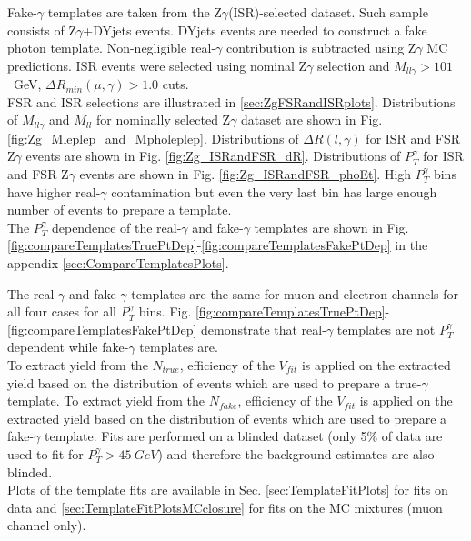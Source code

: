Fake-$\gamma$ templates are taken from the Z$\gamma$(ISR)-selected dataset. Such sample consists of Z$\gamma$+DYjets events. DYjets events are needed to construct a fake photon template. Non-negligible real-$\gamma$ contribution is subtracted using Z$\gamma$ MC predictions. ISR events were selected using nominal Z$\gamma$ selection and $M_{ll\gamma}>101$~GeV, $\Delta{R_{min}}(\mu,\gamma)>1.0$ cuts. \\

FSR and ISR selections are illustrated in \ref{sec:ZgFSRandISRplots}. Distributions of $M_{ll\gamma}$ and $M_{ll}$ for nominally selected Z$\gamma$ dataset are shown in Fig. \ref{fig:Zg_Mleplep_and_Mpholeplep}. Distributions of $\Delta{R}(l,\gamma)$ for ISR and FSR Z$\gamma$ events are shown in Fig. \ref{fig:Zg_ISRandFSR_dR}. Distributions of $P_{T}^{\gamma}$ for ISR and FSR Z$\gamma$ events are shown in Fig. \ref{fig:Zg_ISRandFSR_phoEt}. High $P_{T}^{\gamma}$ bins have higher real-$\gamma$ contamination but even the very last bin has large enough number of events to prepare a template.\\ 

The $P_{T}^{\gamma}$ dependence of the real-$\gamma$ and fake-$\gamma$ templates are shown in Fig. \ref{fig:compareTemplatesTruePtDep}-\ref{fig:compareTemplatesFakePtDep} in the appendix \ref{sec:CompareTemplatesPlots}. 

The real-$\gamma$ and fake-$\gamma$ templates are the same for muon and electron channels for all four cases for all $P_{T}^{\gamma}$ bins. Fig. \ref{fig:compareTemplatesTruePtDep}-\ref{fig:compareTemplatesFakePtDep} demonstrate that real-$\gamma$ templates are not $P_{T}^{\gamma}$ dependent while fake-$\gamma$ templates are.\\

To extract yield from the $N_{true}$, efficiency of the $V_{fit}$ is applied on the extracted yield based on the distribution of events which are used to prepare a true-$\gamma$ template. To extract yield from the $N_{fake}$, efficiency of the $V_{fit}$ is applied on the extracted yield based on the distribution of events which are used to prepare a fake-$\gamma$ template. Fits are performed on a blinded dataset (only 5\% of data are used to fit for $P_T^{\gamma}>45~GeV$) and therefore the background estimates are also blinded.\\

Plots of the template fits are available in Sec. \ref{sec:TemplateFitPlots} for fits on data and \ref{sec:TemplateFitPlotsMCclosure} for fits on the MC mixtures (muon channel only).

